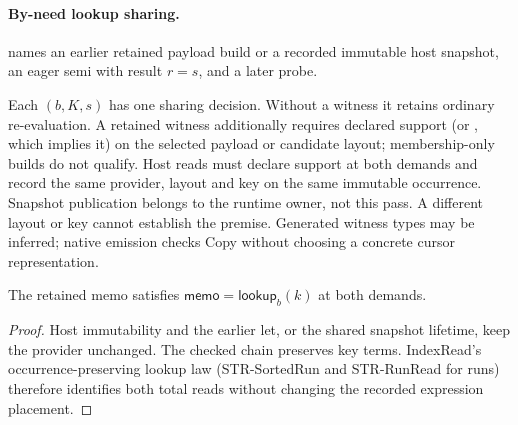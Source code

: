 \paragraph{By-need lookup sharing.}
 names an earlier retained
payload build or a recorded immutable host snapshot, an eager semi
with result $r=s$, and a later probe.
\begin{mathpar}
\end{mathpar}
Each $(b,K,s)$ has one sharing decision. Without a witness it retains
ordinary re-evaluation. A retained witness additionally requires declared
 support (or , which implies it) on the selected
payload or candidate layout; membership-only builds do not qualify.
Host reads must declare support at both demands and record the same provider,
layout and key on the same immutable occurrence. Snapshot publication belongs
to the runtime owner, not this pass. A different layout or key cannot establish
the premise. Generated witness types may be inferred; native emission checks
Copy without choosing a concrete cursor representation.
\begin{lemma}
The retained memo satisfies $\mathsf{memo}=\mathsf{lookup}_b(k)$ at both demands.
\end{lemma}
\begin{proof}
Host immutability and the earlier let, or the shared snapshot lifetime,
keep the provider unchanged. The checked chain preserves key terms.
IndexRead's occurrence-preserving lookup law (STR-SortedRun and STR-RunRead
for runs) therefore identifies both total reads without changing the recorded
expression placement.
\end{proof}

